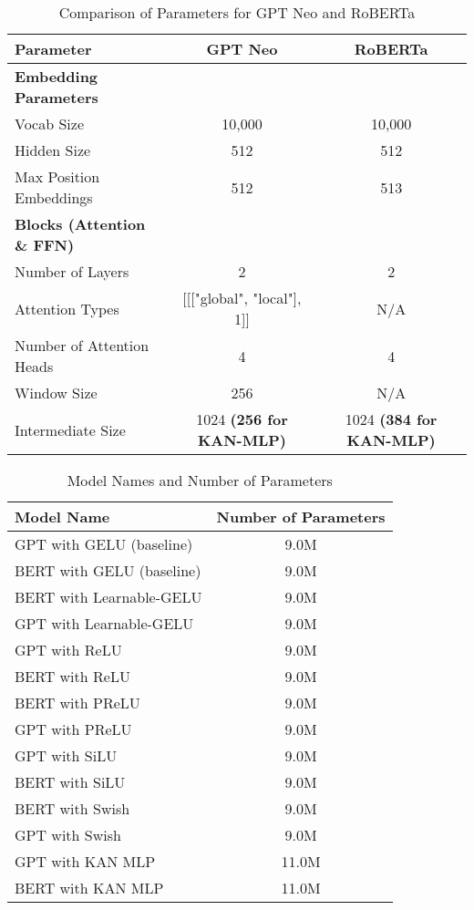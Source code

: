 \begin{table*}[h!]
    \centering
    \begin{tabular}{|l|c|c|}
    \hline
    \textbf{Parameter} & \textbf{GPT Neo} & \textbf{RoBERTa} \\ \hline
    \textbf{Embedding Parameters} & & \\ \hline
    Vocab Size & 10,000 & 10,000 \\ \hline
    Hidden Size & 512 & 512 \\ \hline
    Max Position Embeddings & 512 & 513 \\ \hline
    \textbf{Blocks (Attention \& FFN)} & & \\ \hline
    Number of Layers & 2 & 2 \\ \hline
    Attention Types & [[["global", "local"], 1]] & N/A \\ \hline
    Number of Attention Heads & 4 & 4 \\ \hline
    Window Size & 256 & N/A \\ \hline
    Intermediate Size & 1024 \textbf{(256 for KAN-MLP)} & 1024 \textbf{(384 for KAN-MLP)} \\ \hline
    \end{tabular}
    \caption{Comparison of Parameters for GPT Neo and RoBERTa}
    \label{tab:Hyperparameters}
\end{table*}

\begin{table}[h!]
    \centering
    \begin{tabular}{|l|c|}
    \hline
    \textbf{Model Name} & \textbf{Number of Parameters} \\ \hline
    GPT with GELU (baseline) & 9.0M \\ \hline
    BERT with GELU (baseline) & 9.0M \\ \hline
    BERT with Learnable-GELU & 9.0M \\ \hline
    GPT with Learnable-GELU & 9.0M \\ \hline
    GPT with ReLU & 9.0M \\ \hline
    BERT with ReLU & 9.0M \\ \hline
    BERT with PReLU & 9.0M \\ \hline
    GPT with PReLU & 9.0M \\ \hline
    GPT with SiLU & 9.0M \\ \hline
    BERT with SiLU & 9.0M \\ \hline
    BERT with Swish & 9.0M \\ \hline
    GPT with Swish & 9.0M \\ \hline
    GPT with KAN MLP & 11.0M \\ \hline
    BERT with KAN MLP & 11.0M \\ \hline
    \end{tabular}
    \caption{Model Names and Number of Parameters}
    \label{tab:parameter-counts}
\end{table}